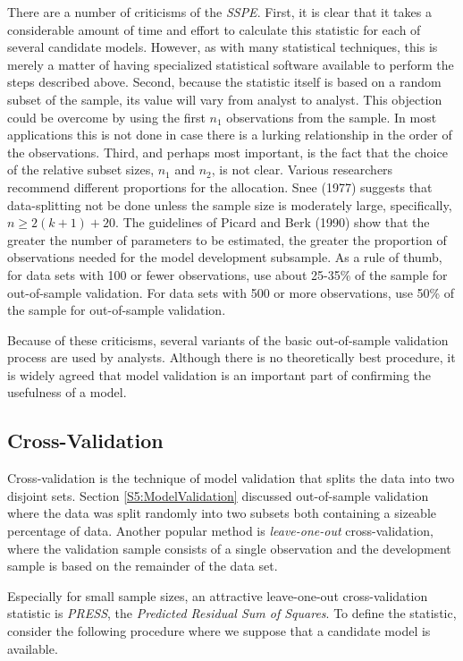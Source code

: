 There are a number of criticisms of the \textit{SSPE}. First, it is
clear that it takes a considerable amount of time and effort to
calculate this statistic for each of several candidate models.
However, as with many statistical techniques, this is merely a
matter of having specialized statistical software available to
perform the steps described above. Second, because the statistic
itself is based on a random subset of the sample, its value will
vary from analyst to analyst. This objection could be overcome by
using the first $n_1$ observations from the sample. In most
applications this is not done in case there is a lurking
relationship in the order of the observations. Third, and perhaps
most important, is the fact that the choice of the relative subset
sizes, $n_1$ and $n_2$, is not clear. Various researchers recommend
different proportions for the allocation. Snee (1977) suggests that
data-splitting not be done unless the sample size is moderately
large, specifically, $n\geq 2(k+1)+20$. The guidelines of Picard and
Berk (1990) show that the greater the number of parameters to be
estimated, the greater the proportion of observations needed for the
model development subsample. As a rule of thumb, for data sets with
100 or fewer observations, use about 25-35\% of the sample for
out-of-sample validation. For data sets with 500 or more
observations, use 50\% of the sample for out-of-sample validation.

Because of these criticisms, several variants of the basic out-of-sample
validation process are used by analysts. Although there is no theoretically
best procedure, it is widely agreed that model validation is an important
part of confirming the usefulness of a model.

\subsection{Cross-Validation}\label{S5:CrossV}

Cross-validation is the technique of model validation that splits
the data into two disjoint sets. Section \ref{S5:ModelValidation}
discussed out-of-sample validation where the data was split randomly
into two subsets both containing a sizeable percentage of data.
Another popular method is \emph{leave-one-out} cross-validation,
where the validation sample consists of a single observation and the
development sample is based on the remainder of the data set.

Especially for small sample sizes, an attractive leave-one-out
cross-validation statistic is \textit{PRESS}, the \textit{Predicted
Residual Sum of Squares}. To define the statistic, consider the
following procedure where we suppose that a candidate model is
available.

